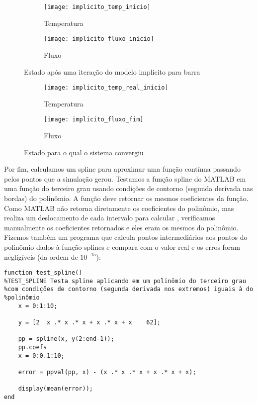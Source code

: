 \documentclass[12pt,fleqn]{article}
\begin{document}
\begin{figure}[H]
	\centering
	\begin{subfigure}{.5\textwidth}
		\centering
		\texttt{[image: implicito\_temp\_inicio]}
		\caption{Temperatura}
	\end{subfigure}%
	\begin{subfigure}{.5\textwidth}
		\centering
		\texttt{[image: implicito\_fluxo\_inicio]}
		\caption{Fluxo}
	\end{subfigure}
	\caption{Estado após uma iteração do modelo implícito para barra}
\end{figure}

\begin{figure}[H]
	\centering
	\begin{subfigure}{.5\textwidth}
		\centering
		\texttt{[image: implicito\_temp\_real\_inicio]}
		\caption{Temperatura}
	\end{subfigure}%
	\begin{subfigure}{.5\textwidth}
		\centering
		\texttt{[image: implicito\_fluxo\_fim]}
		\caption{Fluxo}
	\end{subfigure}
	\caption{Estado para o qual o sistema convergiu}
\end{figure}

Por fim, calculamos um spline para aproximar uma função contínua passando pelos pontos que a simulação gerou. Testamos a função spline do MATLAB em uma função do terceiro grau usando condições de contorno (segunda derivada nas bordas) do polinômio. A função deve retornar os mesmos coeficientes da função. Como MATLAB não retorna diretamente os coeficientes do polinômio, mas realiza um deslocamento de cada intervalo para calcular \cite{splines}, verificamos manualmente os coeficientes retornados e eles eram os mesmos do polinômio. Fizemos também um programa que calcula pontos intermediários aos pontos do polinômio dados à função splines e compara com o valor real e os erros foram negligíveis (da ordem de $10^{-15}$):

\begin{verbatim}
function test_spline()
%TEST_SPLINE Testa spline aplicando em um polinômio do terceiro grau
%com condições de contorno (segunda derivada nos extremos) iguais à do
%polinômio
	x = 0:1:10;

	y = [2	x .* x .* x + x .* x + x	62];

	pp = spline(x, y(2:end-1));
	pp.coefs
	x = 0:0.1:10;

	error = ppval(pp, x) - (x .* x .* x + x .* x + x);

	display(mean(error));
end
\end{verbatim}
\end{document}
